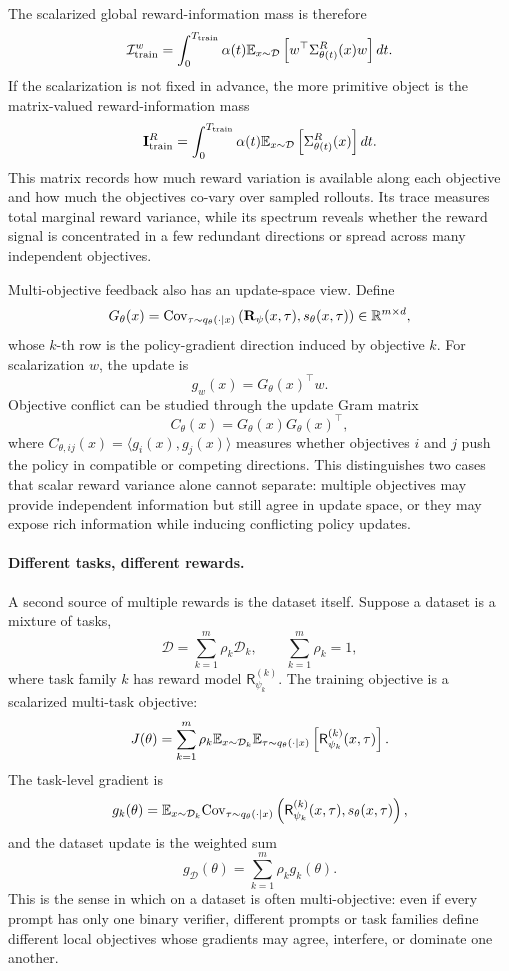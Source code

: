 The scalarized global reward-information mass is therefore
\[
  \mathcal{I}_{\mathrm{train}}^w
  =
  \int_0^{T_{\mathrm{train}}}
  \alpha(t)
  \mathbb{E}_{x\sim\mathcal{D}}
  \left[
    w^\top \Sigma_{\theta(t)}^R(x)w
  \right]
  dt.
\]
If the scalarization is not fixed in advance, the more primitive object is the matrix-valued reward-information mass
\[
  \mathbf{I}_{\mathrm{train}}^{R}
  =
  \int_0^{T_{\mathrm{train}}}
  \alpha(t)
  \mathbb{E}_{x\sim\mathcal{D}}
  \left[
    \Sigma_{\theta(t)}^R(x)
  \right]
  dt.
\]
This matrix records how much reward variation is available along each objective and how much the objectives co-vary over sampled rollouts. Its trace measures total marginal reward variance, while its spectrum reveals whether the reward signal is concentrated in a few redundant directions or spread across many independent objectives.

Multi-objective feedback also has an update-space view. Define
\[
  G_\theta(x)
  =
  \mathrm{Cov}_{\tau\sim q_\theta(\cdot\mid x)}
  \left(
    \mathbf{R}_\psi(x,\tau),
    s_\theta(x,\tau)
  \right)
  \in \mathbb{R}^{m\times d},
\]
whose $k$-th row is the policy-gradient direction induced by objective $k$. For scalarization $w$, the update is
\[
  g_w(x)=G_\theta(x)^\top w.
\]
Objective conflict can be studied through the update Gram matrix
\[
  C_\theta(x)=G_\theta(x)G_\theta(x)^\top,
\]
where $C_{\theta,ij}(x)=\langle g_i(x),g_j(x)\rangle$ measures whether objectives $i$ and $j$ push the policy in compatible or competing directions. This distinguishes two cases that scalar reward variance alone cannot separate: multiple objectives may provide independent information but still agree in update space, or they may expose rich information while inducing conflicting policy updates.

\paragraph{Different tasks, different rewards.}
A second source of multiple rewards is the dataset itself. Suppose a dataset is a mixture of tasks,
\[
  \mathcal{D}=\sum_{k=1}^m \rho_k \mathcal{D}_k,
  \qquad
  \sum_{k=1}^m \rho_k=1,
\]
where task family $k$ has reward model $\mathsf{R}_{\psi_k}^{(k)}$. The training objective is a scalarized multi-task objective:
\[
  J(\theta)
  =
  \sum_{k=1}^m \rho_k
  \mathbb{E}_{x\sim \mathcal{D}_k}
  \mathbb{E}_{\tau\sim q_\theta(\cdot\mid x)}
  \left[
    \mathsf{R}_{\psi_k}^{(k)}(x,\tau)
  \right].
\]
The task-level gradient is
\[
  g_k(\theta)
  =
  \mathbb{E}_{x\sim \mathcal{D}_k}
  \mathrm{Cov}_{\tau\sim q_\theta(\cdot\mid x)}
  \left(
    \mathsf{R}_{\psi_k}^{(k)}(x,\tau),
    s_\theta(x,\tau)
  \right),
\]
and the dataset update is the weighted sum
\[
  g_{\mathcal{D}}(\theta)=\sum_{k=1}^m \rho_k g_k(\theta).
\]
This is the sense in which \llm{} \rlvr{} on a dataset is often multi-objective: even if every prompt has only one binary verifier, different prompts or task families define different local objectives whose gradients may agree, interfere, or dominate one another.

